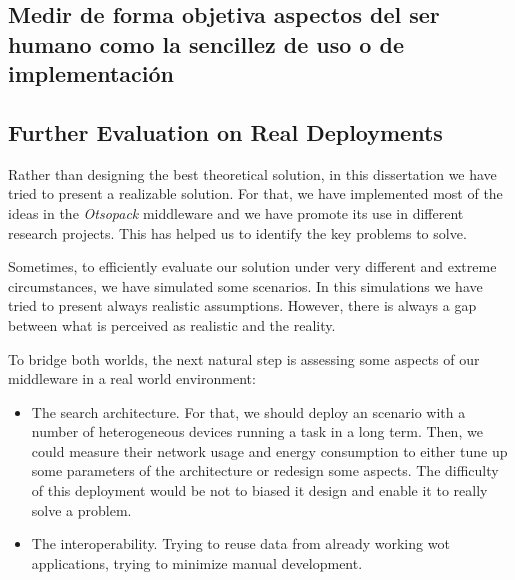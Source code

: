 

\subsection{Medir de forma objetiva aspectos del ser humano como la sencillez de uso o de implementación}






\subsection{Further Evaluation on Real Deployments}

Rather than designing the best theoretical solution, in this dissertation we have tried to present a realizable solution.
For that, we have implemented most of the ideas in the \emph{Otsopack} middleware and we have promote its use in different research projects.
This has helped us to identify the key problems to solve.


Sometimes, to efficiently evaluate our solution under very different and extreme circumstances, we have simulated some scenarios. %
In this simulations we have tried to present always realistic assumptions.
However, there is always a gap between what is perceived as realistic and the reality.


To bridge both worlds, the next natural step is assessing some aspects of our middleware in a real world environment: %
\begin{itemize}
  \item The search architecture.
        For that, we should deploy an scenario with a number of heterogeneous devices running a task in a long term.
        Then, we could measure their network usage and energy consumption to either tune up some parameters of the architecture or redesign some aspects.
        The difficulty of this deployment would be not to biased it design and enable it to really solve a problem.
  \item The interoperability.
        Trying to reuse data from already working \ac{wot} applications, trying to minimize manual development.
\end{itemize}


